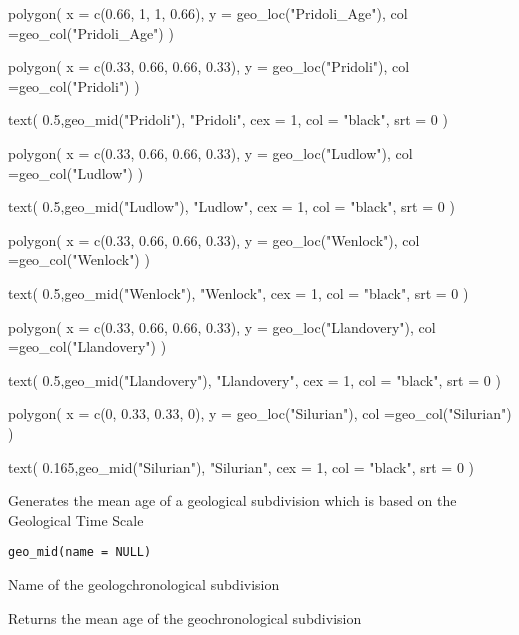 \documentclass[a4paper]{book}
\begin{document}
\begin{Examples}
\begin{ExampleCode}
polygon(
 x = c(0.66, 1, 1, 0.66),
 y = geo_loc("Pridoli_Age"),
 col =geo_col("Pridoli_Age")
)



polygon(
 x = c(0.33, 0.66, 0.66, 0.33),
 y = geo_loc("Pridoli"),
 col =geo_col("Pridoli")
)

text(
 0.5,geo_mid("Pridoli"),
 "Pridoli",
 cex = 1,
 col = "black",
 srt = 0
)


polygon(
 x = c(0.33, 0.66, 0.66, 0.33),
 y = geo_loc("Ludlow"),
 col =geo_col("Ludlow")
)

text(
 0.5,geo_mid("Ludlow"),
 "Ludlow",
 cex = 1,
 col = "black",
 srt = 0
)

polygon(
 x = c(0.33, 0.66, 0.66, 0.33),
 y = geo_loc("Wenlock"),
 col =geo_col("Wenlock")
)

text(
 0.5,geo_mid("Wenlock"),
 "Wenlock",
 cex = 1,
 col = "black",
 srt = 0
)

polygon(
 x = c(0.33, 0.66, 0.66, 0.33),
 y = geo_loc("Llandovery"),
 col =geo_col("Llandovery")
)

text(
 0.5,geo_mid("Llandovery"),
 "Llandovery",
 cex = 1,
 col = "black",
 srt = 0
)

polygon(
 x = c(0, 0.33, 0.33, 0),
 y = geo_loc("Silurian"),
 col =geo_col("Silurian")
)

text(
 0.165,geo_mid("Silurian"),
 "Silurian",
 cex = 1,
 col = "black",
 srt = 0
)


\end{ExampleCode}
\end{Examples}
%
\begin{Description}
Generates the mean age of a
geological subdivision which is based on the Geological Time Scale
\end{Description}
%
\begin{Usage}
\begin{verbatim}
geo_mid(name = NULL)
\end{verbatim}
\end{Usage}
%
\begin{Arguments}
\begin{ldescription}
\item[\code{name}] Name of the geologchronological subdivision
\end{ldescription}
\end{Arguments}
%
\begin{Value}
Returns the mean age of the geochronological subdivision
\end{Value}
\end{document}
